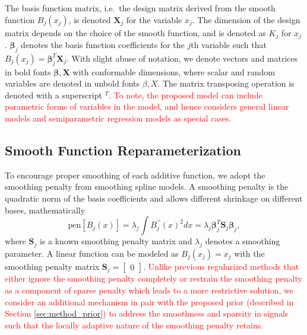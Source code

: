 \documentclass[AMA,STIX1COL,]{WileyNJD-v2}
\begin{document}
The basis function matrix, i.e.~the design matrix derived from the
smooth function \(B_j(x_j)\), is denoted \(\boldsymbol{X}_j\) for the
variable \(x_j\). The dimension of the design matrix depends on the
choice of the smooth function, and is denoted as \(K_j\) for \(x_j\).
\(\boldsymbol{\beta}_j\) denotes the basis function coefficients for the
\(j\)th variable such that
\(B_j(x_j) = \boldsymbol{\beta}_j^T \boldsymbol{X}_j\). With slight
abuse of notation, we denote vectors and matrices in bold fonts
\(\boldsymbol{\beta}, \boldsymbol{X}\) with conformable dimensions,
where scalar and random variables are denoted in unbold fonts
\(\beta, X\). The matrix transposing operation is denoted with a
superscript \(^T\).
\textcolor{red}{To note, the proposed model can include parametric forms of variables in the model, and hence considers general linear models and semiparametric regression models as special cases.}

\subsection{Smooth Function Reparameterization}

To encourage proper smoothing of each additive function, we adopt the
smoothing penalty from smoothing spline models\citep{Wood2017}. A
smoothing penalty is the quadratic norm of the basis coefficients and
allows different shrinkage on different bases, mathematically
\begin{equation}
  \text{pen}\left[B_j(x)\right] = \lambda_j \int B^{\prime\prime}_j(x)^2dx = \lambda_j \boldsymbol{\beta}_j^T \boldsymbol{S}_j \boldsymbol{\beta}_j ,\nonumber
\end{equation} where \(\boldsymbol{S}_j\) is a known smoothing penalty
matrix and \(\lambda_j\) denotes a smoothing parameter. A linear
function can be modeled as \(B_j(x_j) = x_j\) with the smoothing penalty
matrix \(\boldsymbol{S}_j = \begin{bmatrix}0\end{bmatrix}\).
\textcolor{red}{Unlike previous regularized methods that either ignore the smoothing penalty completely or restrain the smoothing penalty as a component of sparse penalty which leads to a more restrictive solution, we consider an additional mechanism in pair with the proposed prior (described in Section \ref{sec:method_prior}) to address the smoothness and sparsity in signals such that the locally adaptive nature of the smoothing penalty retains.}
\end{document}
